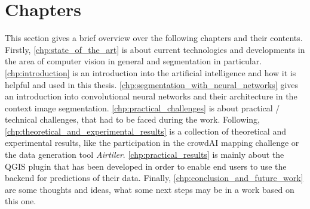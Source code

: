 \section{Chapters}
This section gives a brief overview over the following chapters and their contents. Firstly, \autoref{chp:state_of_the_art} is about current technologies and developments in the area of computer vision in general and segmentation in particular. \autoref{chp:introduction} is an introduction into the artificial intelligence and how it is helpful and used in this thesis. \autoref{chp:segmentation_with_neural_networks} gives an introduction into convolutional neural networks and their architecture in the context image segmentation. \autoref{chp:practical_challenges} is about practical / technical challenges, that had to be faced during the work. Following, \autoref{chp:theoretical_and_experimental_results} is a collection of theoretical and experimental results, like the participation in the crowdAI mapping challenge or the data generation tool \textit{Airtiler}. \autoref{chp:practical_results} is mainly about the QGIS plugin that has been developed in order to enable end users to use the backend for predictions of their data. Finally, \autoref{chp:conclusion_and_future_work} are some thoughts and ideas, what some next steps may be in a work based on this one.
